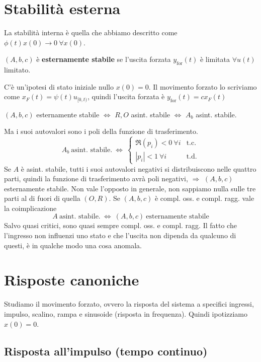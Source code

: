 \documentclass[10pt,a4paper]{book}
\begin{document}
\chapter{Stabilità esterna}

La stabilità interna è quella che abbiamo descritto come $\phi (t) x(0)\rightarrow 0\ \forall x(0)$.
\begin{definition}
	$(A,b,c)$ è \textbf{esternamente stabile} se l'uscita forzata $y_{\text{for}}(t)$ è limitata $\forall u(t)$ limitato.
\end{definition}
C'è un'ipotesi di stato iniziale nullo $x(0) =0$. Il movimento forzato lo scriviamo come $x_F(t) =\psi (t) u_{[ 0,t)}$, quindi l'uscita forzata è $y_{\text{for}}(t) =cx_F(t)$
\begin{theorem}
	$(A,b,c)$ esternamente stabile $\Leftrightarrow $ $R,O$ asint. stabile $\Leftrightarrow $ $A_b$ asint. stabile.
\end{theorem}
Ma i suoi autovalori sono i poli della funzione di trasferimento.
\begin{equation*}
	A_b \ \text{asint. stabile.} \ \Leftrightarrow \ \begin{cases}
	\Re(p_i) < 0\ \forall i & \text{t.c.}\\
	| p_i| < 1\ \forall i & \text{t.d.}
	\end{cases}
\end{equation*}
Se $A$ è asint. stabile, tutti i suoi autovalori negativi si distribuiscono nelle quattro parti, quindi la funzione di trasferimento avrà poli negativi, $\Rightarrow $ $(A,b,c)$ esternamente stabile. Non vale l'opposto in generale, non sappiamo nulla sulle tre parti al di fuori di quella $(O,R)$. Se $(A,b,c)$ è compl. oss. e compl. ragg. vale la coimplicazione
\begin{equation*}
	A\ \text{asint. stabile.} \ \Leftrightarrow \ (A,b,c) \ \text{esternamente stabile}
\end{equation*}
Salvo quasi critici, sono quasi sempre compl. oss. e compl. ragg. Il fatto che l'ingresso non influenzi uno stato e che l'uscita non dipenda da qualcuno di questi, è in qualche modo una cosa anomala.
\chapter{Risposte canoniche}

Studiamo il movimento forzato, ovvero la risposta del sistema a specifici ingressi, impulso, scalino, rampa e sinusoide (risposta in frequenza). Quindi ipotizziamo $x(0) =0$.
\section{Risposta all'impulso (tempo continuo)}
\end{document}
